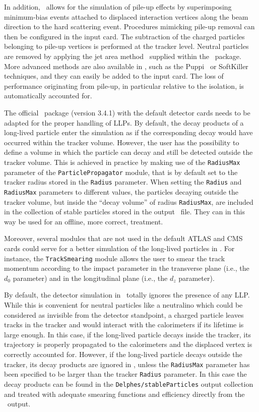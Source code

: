 In addition, \DEL\ allows for the simulation of pile-up effects by
superimposing minimum-bias events attached to displaced interaction vertices
along the beam direction
to the hard scattering event. Procedures mimicking pile-up
removal can then be configured in the input card. The subtraction of the charged
particles belonging to pile-up vertices is performed at the tracker level.
Neutral particles are removed by applying the jet area
method~\cite{Cacciari:2007fd} supplied within the \FJ\ package. More advanced methods are also available in \DEL, such as the
{\sc Puppi}~\cite{Bertolini:2014bba} or {\sc SoftKiller}~\cite{Cacciari:2014gra}
techniques, and they can easily be added to the input card. The loss of
performance originating from pile-up, in particular relative to the isolation, is
automatically accounted for.

The official \DEL\ package (version 3.4.1) with the default detector cards needs
to be adapted for the proper handling of LLPs.
By default, the decay products of a long-lived particle enter the
simulation as if the corresponding decay would have occurred within the
tracker volume. However, the user has the possibility to define a volume in
which the particle can decay and still be detected outside the tracker volume. This is achieved in
practice by making use of the \verb+RadiusMax+ parameter of the
\verb+ParticlePropagator+ module, that is by default set to the tracker radius
stored in the \verb+Radius+ parameter. When setting the \verb+Radius+ and
\verb+RadiusMax+ parameters to different values, the particles decaying outside
the tracker volume, but inside the ``decay volume'' of radius \verb+RadiusMax+, are
included in the collection of stable particles stored in the output \ROOT\ file.
They can in this way be used for an offline, more correct, treatment.

Moreover, several modules that are not used in the default ATLAS and CMS cards
could serve for a better simulation of the long-lived particles in \DEL . For
instance, the \verb+TrackSmearing+ module allows the user to smear the track momentum
according to the impact parameter in the transverse plane (i.e., the $d_0$
parameter) and in the longitudinal plane (i.e., the $d_z$ parameter).

By default, the detector simulation in \DEL\ totally ignores the presence of any
LLP. While this is convenient for neutral particles like a
neutralino which could be considered as invisible from the detector standpoint,
a charged particle leaves tracks in the tracker and would interact with the
calorimeters if its lifetime is large enough.
In this case, if the long-lived particle decays inside the tracker, its
trajectory is properly propagated to the calorimeters and the displaced vertex
is correctly accounted for. However, if the long-lived particle decays outside
the tracker, its decay products are ignored in \DEL, unless the \verb+RadiusMax+
parameter has been specified to be larger than the tracker \verb+Radius+
parameter. In this case the decay products can be found in the
\verb+Delphes/stableParticles+ output collection and
treated with adequate smearing functions and efficiency directly from the \DEL\
output.

